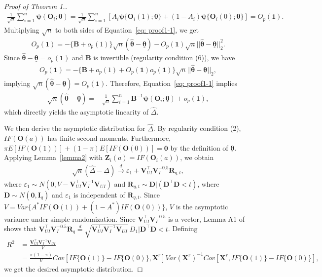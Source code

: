 \documentclass[12pt]{article}
\newcommand{\bX}{\boldsymbol{X}}
\newcommand{\bO}{\boldsymbol{O}}
\newcommand{\bZ}{\boldsymbol{Z}}
\newcommand{\bR}{\boldsymbol{R}}
\newcommand{\bD}{\boldsymbol{D}}
\newcommand{\bone}{\boldsymbol{1}}
\newcommand{\bzero}{\boldsymbol{0}}
\newcommand{\btheta}{\boldsymbol{\theta}}
\newcommand{\bpsi}{\boldsymbol{\psi}}
\newcommand{\bfB}{\mathbf{B}}
\newcommand{\bfV}{\mathbf{V}}
\begin{document}
\begin{proof}[Proof of Theorem 1.]
\begin{align*}
    \frac{1}{\sqrt{n}}\sum_{i=1}^n \bpsi(\bO_i;\underline{\btheta}) = \frac{1}{\sqrt{n}}\sum_{i=1}^n [A_i\bpsi\{\bO_i(1);\underline{\btheta}\} + (1-A_i)\bpsi\{\bO_i(0);\underline{\btheta}\}] = O_p(\bone).
\end{align*}
Multiplying $\sqrt{n}$ to both sides of Equation~\eqref{eq: proof1-1}, we get
\begin{align*}
    O_p(\bone) = - \{\bfB + o_p(1)\} \sqrt{n}(\widehat{\btheta} - \underline{\btheta}) - O_p(\bone) \sqrt{n}||\widehat{\btheta} - \underline{\btheta}||_2^2.
\end{align*}
Since $\widehat{\btheta} - \underline{\btheta} = o_p(\bone)$ and $\bfB$ is invertible (regularity condition (6)), we have
\begin{align*}
     O_p(\bone) = - \{\bfB + o_p(1) + O_p(\bone)o_p(\bone)\} \sqrt{n}||\widehat{\btheta} - \underline{\btheta}||_2,
\end{align*}
implying $\sqrt{n}(\widehat{\btheta} - \underline{\btheta}) = O_p(\bone)$. Therefore, Equation~\eqref{eq: proof1-1} implies
\begin{align*}
    \sqrt{n}(\widehat{\btheta} - \underline{\btheta}) = - \frac{1}{\sqrt{n}}\sum_{i=1}^n \bfB^{-1} \bpsi(\bO_i;\underline{\btheta}) + o_p(\bone),
\end{align*}
which directly yields the asymptotic linearity of $\widehat{\Delta}$.

We then derive the asymptotic distribution for $\widehat{\Delta}$. By regularity condition (2), $IF(\bO(a))$ has finite second moments. Furthermore, $\pi E[IF(\bO(1))] + (1-\pi) E[IF(\bO(0))] = \bzero$ by the definition of $\underline{\btheta}$. Applying Lemma~\ref{lemma2} with $\bZ_i(a) = IF(\bO_i(a))$, we obtain 
\begin{align*}
    \sqrt{n}(\widehat{\Delta} - \underline{\Delta}) \xrightarrow{d} \varepsilon_1 + \bfV_{UI}^\top \bfV_I^{-0.5} \bR_{q,t},
\end{align*}
where $\varepsilon_1 \sim N(0, V-\bfV_{UI}^\top \bfV_I^{-1}\bfV_{UI})$ and $\bR_{q,t} \sim  \bD|( \bD^\top  \bD < t)$,  where $\bD \sim N(\bzero, \mathbf{I}_q)$ and $\varepsilon_1$ is independent of $\bR_{q,t}$. Since $V = Var\{A^* IF(\bO(1))+(1-A^*)IF(\bO(0))\}$, $V$ is the asymptotic variance under simple randomization. Since $\bfV_{UI}^\top \bfV_I^{-0.5}$ is a vector, Lemma A1 of \cite{li2018asymptotic} shows that $\bfV_{UI}^\top \bfV_I^{-0.5} \bR_q \overset{d}{=} \sqrt{\bfV_{UI}^\top \bfV_I^{-1} \bfV_{UI}}\ D_1|\bD^\top \bD < t$. Defining
\begin{align*}
    R^2 &= \frac{\bfV_{UI}^\top \bfV_I^{-1} \bfV_{UI}}{V}\\
    &= \frac{\pi(1-\pi)}{V} Cov[IF\{\bO(1)\}- IF\{\bO(0)\}, \bX^r]Var(\bX^r)^{-1}Cov[\bX^r, IF\{\bO(1)\}- IF\{\bO(0)\}],
\end{align*}
we get the desired asymptotic distribution. 


\end{proof}
\end{document}
